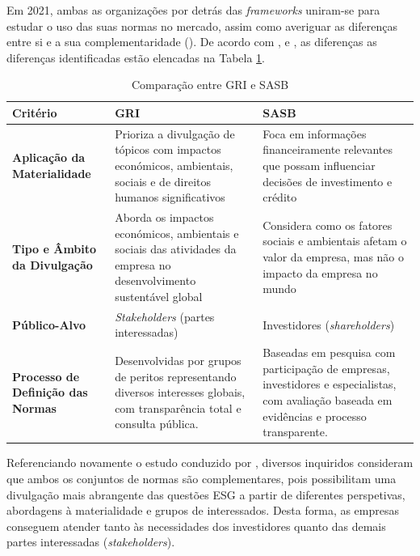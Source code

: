 Em 2021, ambas as organizações por detrás das \textit{frameworks} uniram-se para estudar o uso das suas normas no mercado, assim como averiguar as diferenças entre si e a sua complementaridade (\cite{GRISASB2021}). De acordo com \cite{GRISASB2021}, \cite{Pizzi2023} e \cite{Antolin-Lopez2023}, as diferenças as diferenças identificadas estão elencadas na Tabela \ref{tab:gri_sasb}.

\begin{table}[h]
    \centering
    \begin{tabular}{|p{2.5cm}|p{5.5cm}|p{5.5cm}|}
        \hline
        \textbf{Critério} & \textbf{GRI} & \textbf{SASB} \\
        \hline
        \textbf{Aplicação da Materialidade} & Prioriza a divulgação de tópicos com impactos económicos, ambientais, sociais e de direitos humanos significativos & Foca em informações financeiramente relevantes que possam influenciar decisões de investimento e crédito \\
        \hline
        \textbf{Tipo e Âmbito da Divulgação} & Aborda os impactos económicos, ambientais e sociais das atividades da empresa no desenvolvimento sustentável global & Considera como os fatores sociais e ambientais afetam o valor da empresa, mas não o impacto da empresa no mundo \\
        \hline
        \textbf{Público-Alvo} & \textit{Stakeholders} (partes interessadas) & Investidores (\textit{shareholders}) \\
        \hline
        \textbf{Processo de Definição das Normas} & Desenvolvidas por grupos de peritos representando diversos interesses globais, com transparência total e consulta pública. & Baseadas em pesquisa com participação de empresas, investidores e especialistas, com avaliação baseada em evidências e processo transparente. \\
        \hline
    \end{tabular}
    \caption{Comparação entre GRI e SASB}
    \label{tab:gri_sasb}
\end{table}

Referenciando novamente o estudo conduzido por \cite{GRISASB2021}, diversos inquiridos consideram que ambos os conjuntos de normas são complementares, pois possibilitam uma divulgação mais abrangente das questões \gls{ESG} a partir de diferentes perspetivas, abordagens à materialidade e grupos de interessados. Desta forma, as empresas conseguem atender tanto às necessidades dos investidores quanto das demais partes interessadas (\textit{stakeholders}).

